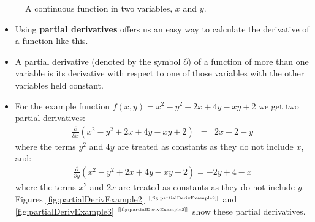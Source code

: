 \documentclass[xcolor={table}]{beamer}
\newcommand{\keyword}[1]{\alert{\textbf{#1}}\index{#1}}
\newcommand{\ourRef}[1]{\ref{#1} $^{\text{\tiny[\pageref{#1}]}}$}
\begin{document}
\begin{frame} [plain]
\begin{figure}[htb]
\begin{center}
\caption{A continuous function in two variables, $x$ and $y$.}
\label{fig:partialDerivExample}
\end{center}
\end{figure}
\end{frame} 


\begin{frame} 
\begin{itemize}
\item Using \keyword{partial derivatives} offers us an easy way to calculate the derivative of a function like this. 
\item A partial derivative (denoted by the symbol $\partial$) of a function of more than one variable is its derivative with respect to one of those variables with the other variables held constant.
\end{itemize}
\end{frame} 

\begin{frame} 
\begin{itemize}
\item For the example function $f(x, y) = x^2 - y^2 + 2x + 4y - xy + 2$ we get two partial derivatives:
\begin{eqnarray*}
\frac{\partial}{\partial x}(x^2 - y^2 + 2x + 4y  - xy + 2) & = & 2x + 2 - y
\end{eqnarray*}
\noindent where the terms $y^2$ and $4y$ are treated as constants as they do not include $x$, and: 
\begin{eqnarray*}
\frac{\partial}{\partial y}(x^2 - y^2 + 2x + 4y - xy + 2) = -2y + 4 - x
\end{eqnarray*}
\noindent where the terms $x^2$ and $2x$ are treated as constants as they do not include $y$. Figures \ourRef{fig:partialDerivExample2} and \ourRef{fig:partialDerivExample3} show these partial derivatives. 
\end{itemize}
\end{frame} 
\end{document}
